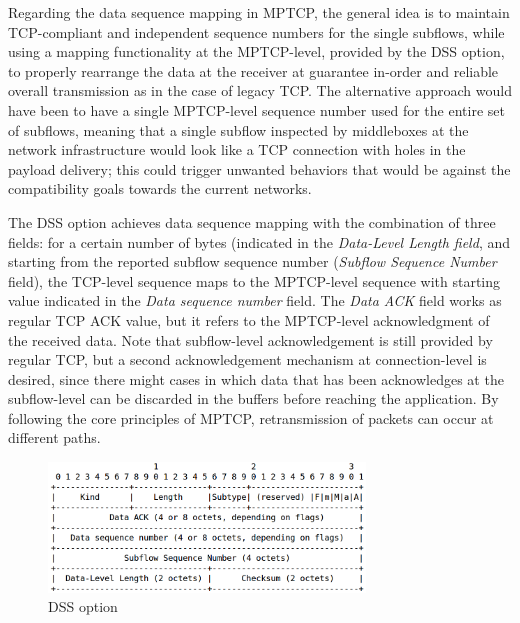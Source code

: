Regarding the data sequence mapping in MPTCP, the general idea is to maintain TCP-compliant and independent sequence numbers for the single subflows, while using a mapping functionality at the MPTCP-level, provided by the DSS option, to properly rearrange the data at the receiver at guarantee in-order and reliable overall transmission as in the case of legacy TCP. The alternative approach would have been to have a single MPTCP-level sequence number used for the entire set of subflows, meaning that a single subflow inspected by middleboxes at the network infrastructure would look like a TCP connection with holes in the payload delivery; this could trigger unwanted behaviors that would be against the compatibility goals towards the current networks.


The DSS option achieves data sequence mapping with the combination of three fields: for a certain number of bytes (indicated in the \textit{Data-Level Length field}, and starting from the reported subflow sequence number (\textit{Subflow Sequence Number} field), the TCP-level sequence maps to the MPTCP-level sequence with starting value indicated in the \textit{Data sequence number} field.
The \textit{Data ACK} field works as regular TCP ACK value, but it refers to the MPTCP-level acknowledgment of the received data. Note that subflow-level acknowledgement is still provided by regular TCP, but a second acknowledgement mechanism at connection-level is desired, since there might cases in which data that has been acknowledges at the subflow-level can be discarded in the buffers before reaching the application. By following the core principles of MPTCP, retransmission of packets can occur at different paths.

\begin{figure}[!htb]
\centering
\includegraphics[width=0.75\textwidth]{images/opt_dss}
\caption{DSS option}
\label{fig:opt_dss}
\end{figure}

